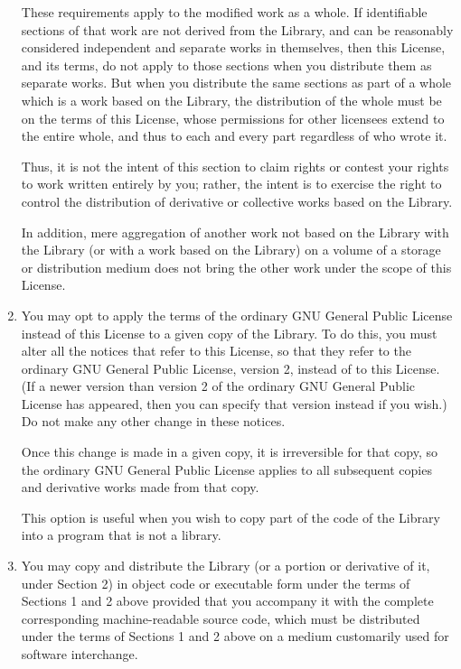 \begin{enumerate}
These requirements apply to the modified work as a whole.  If
identifiable sections of that work are not derived from the Library,
and can be reasonably considered independent and separate works in
themselves, then this License, and its terms, do not apply to those
sections when you distribute them as separate works.  But when you
distribute the same sections as part of a whole which is a work based
on the Library, the distribution of the whole must be on the terms of
this License, whose permissions for other licensees extend to the
entire whole, and thus to each and every part regardless of who wrote
it.

Thus, it is not the intent of this section to claim rights or contest
your rights to work written entirely by you; rather, the intent is to
exercise the right to control the distribution of derivative or
collective works based on the Library.

In addition, mere aggregation of another work not based on the Library
with the Library (or with a work based on the Library) on a volume of
a storage or distribution medium does not bring the other work under
the scope of this License.

\item You may opt to apply the terms of the ordinary GNU General Public
License instead of this License to a given copy of the Library.  To do
this, you must alter all the notices that refer to this License, so
that they refer to the ordinary GNU General Public License, version 2,
instead of to this License.  (If a newer version than version 2 of the
ordinary GNU General Public License has appeared, then you can specify
that version instead if you wish.)  Do not make any other change in
these notices.

  Once this change is made in a given copy, it is irreversible for
that copy, so the ordinary GNU General Public License applies to all
subsequent copies and derivative works made from that copy.

  This option is useful when you wish to copy part of the code of
the Library into a program that is not a library.

\item You may copy and distribute the Library (or a portion or
derivative of it, under Section 2) in object code or executable form
under the terms of Sections 1 and 2 above provided that you accompany
it with the complete corresponding machine-readable source code, which
must be distributed under the terms of Sections 1 and 2 above on a
medium customarily used for software interchange.


\end{enumerate}
